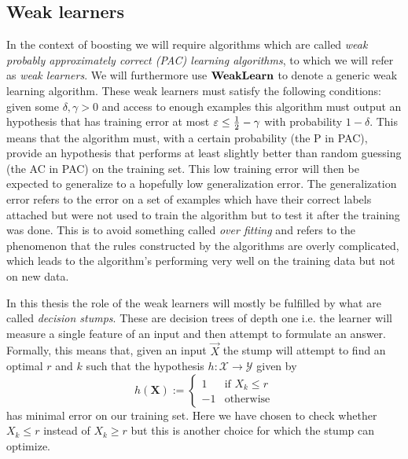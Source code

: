 \subsection{Weak learners}
\label{subsec:weak}
In the context of boosting we will require algorithms which are called \textit{weak probably approximately correct (PAC) learning algorithms}\cite{Freund1997}, to which we will refer as \textit{weak learners}. We will furthermore use $\textbf{WeakLearn}$ to denote a generic weak learning algorithm. These weak learners must satisfy the following conditions: given some $\delta,\gamma >0$ and access to enough examples this algorithm must output an hypothesis that has training error at most $\varepsilon \leq \frac12 - \gamma$ with probability $1-\delta$. This means that the algorithm must, with a certain probability (the P in PAC), provide an hypothesis that performs at least slightly better than random guessing (the AC in PAC) on the training set. This low training error will then be expected to generalize to a hopefully low generalization error. The generalization error refers to the error on a set of examples which have their correct labels attached but were not used to train the algorithm but to test it after the training was done. This is to avoid something called \textit{over fitting} and refers to the phenomenon that the rules constructed by the algorithms are overly complicated, which leads to the algorithm's performing very well on the training data but not on new data. 

\par In this thesis the role of the weak learners will mostly be fulfilled by what are called \textit{decision stumps}. These are decision trees of depth one i.e. the learner will measure a single feature of an input and then attempt to formulate an answer. Formally, this means that, given an input $\vec X$ the stump will attempt to find an optimal $r$ and $k$ such that the hypothesis $h:\mathcal X \to \mathcal Y$ given by $$h(\mathbf X):= \begin{cases}1 &\text{if } X_k \leq r\\-1&\text{otherwise}\end{cases}$$ has minimal error on our training set. Here we have chosen to check whether $X_k\leq r$ instead of $X_k\geq r$ but this is another choice for which the stump can optimize. 

